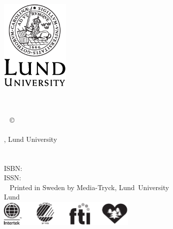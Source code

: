 \cleardoublepage
\thispagestyle{empty} %
~
\vfill
\begin{center}
{\Huge \myMainTitle}
\\[2mm]
{\huge \mySubTitle}
\vfill
{\Huge \myName}
\vfill
\includegraphics[width=0.25\textwidth]{img/LundUniversity_logo.eps}
\end{center}
\vfill


\newpage 
\thispagestyle{empty} %
~
\vfill
\vfill
{\small
\myCoverFront\\
~
\myCoverBack\\
~
\myFundingSource
\vspace{5mm}
\copyright\, \myName~\myCopyrightYear\\
~
{\myDepartment} \\ \myFaculty, Lund University \vspace{1em} \\
~
\mySourceLocation\\[1em]
~
\mySeries\\
ISBN: \myISBNprint \\ %
ISSN: \myISSN \\[0.5em]
~
Printed in Sweden by Media-Tryck, Lund~University\\
Lund~\myCopyrightYear\\[4mm]
\includegraphics[width=0.5\textwidth]{img/miljoeloggor}
}
